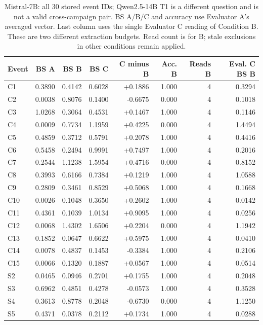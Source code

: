 \begin{table}[!htbp]
\centering\small
\caption{Mistral-7B: all 30 stored event IDs; Qwen2.5-14B T1 is a different question and is not a valid cross-campaign pair. BS A/B/C and accuracy use Evaluator A's averaged vector. Last column uses the single Evaluator C reading of Condition B. These are two different extraction budgets. Read count is for B; stale exclusions in other conditions remain applied.}
\label{tab:full_events_mistral7b}
\begin{tabular}{lrrrrrrr}
\toprule
Event & BS A & BS B & BS C & C minus B & Acc. B & Reads B & Eval. C BS B \\
\midrule
C1 & 0.3890 & 0.4142 & 0.6028 & +0.1886 & 1.000 & 4 & 0.3294 \\
C2 & 0.0038 & 0.8076 & 0.1400 & -0.6675 & 0.000 & 4 & 0.1018 \\
C3 & 1.0268 & 0.3064 & 0.4531 & +0.1467 & 1.000 & 4 & 0.1146 \\
C4 & 0.0009 & 0.7734 & 1.1959 & +0.4225 & 0.000 & 4 & 1.4494 \\
C5 & 0.4859 & 0.3712 & 0.5791 & +0.2078 & 1.000 & 4 & 0.4416 \\
C6 & 0.5458 & 0.2494 & 0.9991 & +0.7497 & 1.000 & 4 & 0.2016 \\
C7 & 0.2544 & 1.1238 & 1.5954 & +0.4716 & 0.000 & 4 & 0.8152 \\
C8 & 0.3993 & 0.6166 & 0.7384 & +0.1219 & 1.000 & 4 & 1.0588 \\
C9 & 0.2809 & 0.3461 & 0.8529 & +0.5068 & 1.000 & 4 & 0.1668 \\
C10 & 0.0026 & 0.1048 & 0.3650 & +0.2602 & 1.000 & 4 & 0.0142 \\
C11 & 0.4361 & 0.1039 & 1.0134 & +0.9095 & 1.000 & 4 & 0.0256 \\
C12 & 0.0068 & 1.4302 & 1.6506 & +0.2204 & 0.000 & 4 & 1.1942 \\
C13 & 0.1852 & 0.0647 & 0.6622 & +0.5975 & 1.000 & 4 & 0.0410 \\
C14 & 0.0078 & 0.4837 & 0.1453 & -0.3384 & 1.000 & 4 & 0.2106 \\
C15 & 0.0066 & 0.1320 & 0.1887 & +0.0567 & 1.000 & 4 & 0.0514 \\
S2 & 0.0465 & 0.0946 & 0.2701 & +0.1755 & 1.000 & 4 & 0.2048 \\
S3 & 0.6962 & 0.4851 & 0.4278 & -0.0573 & 1.000 & 4 & 0.3528 \\
S4 & 0.3613 & 0.8778 & 0.2048 & -0.6730 & 0.000 & 4 & 1.1250 \\
S5 & 0.4371 & 0.0378 & 0.2112 & +0.1734 & 1.000 & 4 & 0.0288 \\

\end{tabular}
\end{table}

